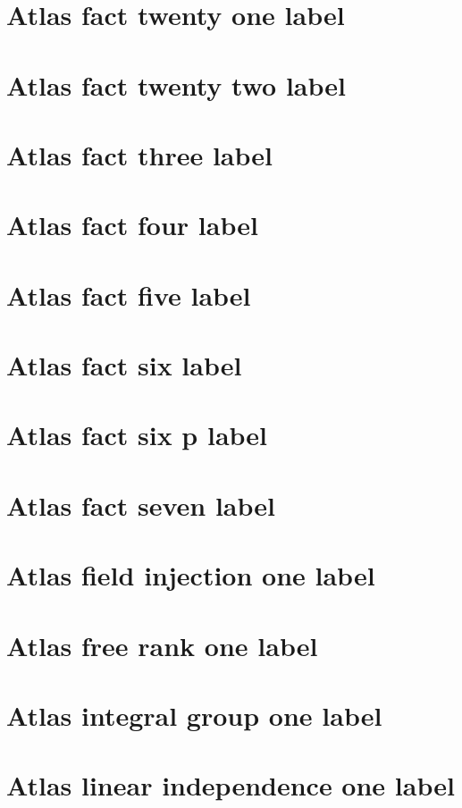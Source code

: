 \documentclass[11pt]{article}
\theoremstyle{definition}
\begin{document}
\section{Atlas fact twenty one label}
\label{ll:labels:atlas-f21}
\section{Atlas fact twenty two label}
\label{ll:labels:atlas-f22}
\section{Atlas fact three label}
\label{ll:labels:atlas-f3}
\section{Atlas fact four label}
\label{ll:labels:atlas-f4}
\section{Atlas fact five label}
\label{ll:labels:atlas-f5}
\section{Atlas fact six label}
\label{ll:labels:atlas-f6}
\section{Atlas fact six p label}
\label{ll:labels:atlas-f6p}
\section{Atlas fact seven label}
\label{ll:labels:atlas-f7}
\section{Atlas field injection one label}
\label{ll:labels:atlas-fi1}
\section{Atlas free rank one label}
\label{ll:labels:atlas-fr1}
\section{Atlas integral group one label}
\label{ll:labels:atlas-ig1}
\section{Atlas linear independence one label}
\label{ll:labels:atlas-li1}
\end{document}
